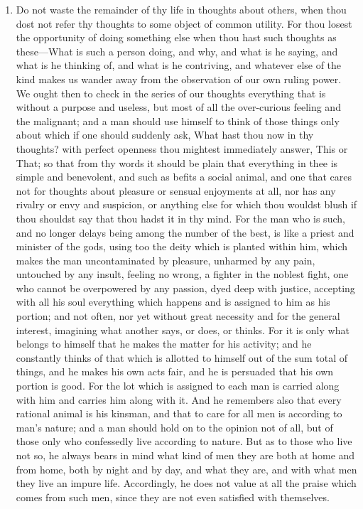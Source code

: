 \begin{enumerate}
\item Do not waste the remainder of thy life in thoughts about others, when thou dost not refer thy thoughts to some object of common utility. For thou losest the opportunity of doing something else when thou hast such thoughts as these—What is such a person doing, and why, and what is he saying, and what is he thinking of, and what is he contriving, and whatever else of the kind makes us wander away from the observation of our own ruling power. We ought then to check in the series of our thoughts everything that is without a purpose and useless, but most of all the over-curious feeling and the malignant; and a man should use himself to think of those things only about which if one should suddenly ask, What hast thou now in thy thoughts? with perfect openness thou mightest immediately answer, This or That; so that from thy words it should be plain that everything in thee is simple and benevolent, and such as befits a social animal, and one that cares not for thoughts about pleasure or sensual enjoyments at all, nor has any rivalry or envy and suspicion, or anything else for which thou wouldst blush if thou shouldst say that thou hadst it in thy mind. For the man who is such, and no longer delays being among the number of the best, is like a priest and minister of the gods, using too the deity which is planted within him, which makes the man uncontaminated by pleasure, unharmed by any pain, untouched by any insult, feeling no wrong, a fighter in the noblest fight, one who cannot be overpowered by any passion, dyed deep with justice, accepting with all his soul everything which happens and is assigned to him as his portion; and not often, nor yet without great necessity and for the general interest, imagining what another says, or does, or thinks. For it is only what belongs to himself that he makes the matter for his activity; and he constantly thinks of that which is allotted to himself out of the sum total of things, and he makes his own acts fair, and he is persuaded that his own portion is good. For the lot which is assigned to each man is carried along with him and carries him along with it. And he remembers also that every rational animal is his kinsman, and that to care for all men is according to man's nature; and a man should hold on to the opinion not of all, but of those only who confessedly live according to nature. But as to those who live not so, he always bears in mind what kind of men they are both at home and from home, both by night and by day, and what they are, and with what men they live an impure life. Accordingly, he does not value at all the praise which comes from such men, since they are not even satisfied with themselves.


\end{enumerate}
